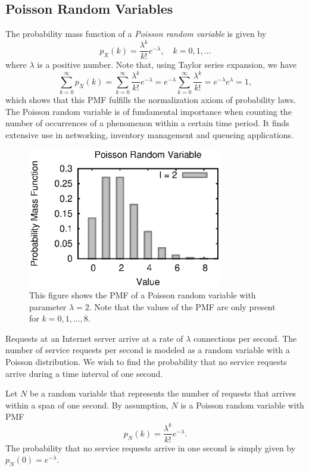\subsection{Poisson Random Variables}

The probability mass function of a \emph{Poisson random variable} is given by 
\begin{equation*}
p_X (k) = \frac{\lambda^k}{k!} e^{- \lambda}, \quad k = 0, 1, \ldots
\end{equation*}
where $\lambda$ is a positive number.
Note that, using Taylor series expansion,  we have
\begin{equation*}
\sum_{k = 0}^{\infty} p_X (k)
= \sum_{k = 0}^{\infty} \frac{\lambda^k}{k!} e^{- \lambda}
= e^{- \lambda} \sum_{k = 0}^{\infty} \frac{\lambda^k}{k!}
= e^{- \lambda} e^{\lambda} = 1 ,
\end{equation*}
which shows that this PMF fulfills the normalization axiom of probability laws.
The Poisson random variable is of fundamental importance when counting the number of occurrences of a phenomenon within a certain time period.
It finds extensive use in networking, inventory management and queueing applications.

\begin{figure}[ht]
\begin{center}
\includegraphics[width=8.5cm]{Figures/5chapter/poisson_pmf}
\caption{This figure shows the PMF of a Poisson random variable with parameter $\lambda = 2$.  Note that the values of the PMF are only present for $k = 0, 1, \ldots, 8$.}
\end{center}
\end{figure}

\begin{example}
Requests at an Internet server arrive at a rate of $\lambda$ connections per second.
The number of service requests per second is modeled as a random variable with a Poisson distribution.
We wish to find the probability that no service requests arrive during a time interval of one second.

Let $N$ be a random variable that represents the number of requests that arrives within a span of one second.
By assumption, $N$ is a Poisson random variable with PMF
\begin{equation*}
p_N (k) = \frac{ \lambda^k }{k!} e^{-\lambda} .
\end{equation*}
The probability that no service requests arrive in one second is simply given by $p_N (0) = e^{-\lambda}$.
\end{example}

